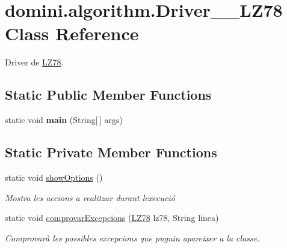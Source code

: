 \hypertarget{classdomini_1_1algorithm_1_1Driver____LZ78}{}\section{domini.\+algorithm.\+Driver\+\_\+\+\_\+\+L\+Z78 Class Reference}
\label{classdomini_1_1algorithm_1_1Driver____LZ78}


Driver de \hyperlink{classdomini_1_1algorithm_1_1LZ78}{L\+Z78}.  


\subsection*{Static Public Member Functions}
\begin{DoxyCompactItemize}
\item 
\mbox{\label{classdomini_1_1algorithm_1_1Driver____LZ78_a3f8db12503ffe92702d5b6670c56e792}} 
static void {\bfseries main} (String\mbox{[}$\,$\mbox{]} args)
\end{DoxyCompactItemize}
\subsection*{Static Private Member Functions}
\begin{DoxyCompactItemize}
\item 
\mbox{\label{classdomini_1_1algorithm_1_1Driver____LZ78_af5e77bd40dbe6c3fa84ee5ee996b6dfe}} 
static void \hyperlink{classdomini_1_1algorithm_1_1Driver____LZ78_af5e77bd40dbe6c3fa84ee5ee996b6dfe}{show\+Options} ()
\begin{DoxyCompactList}\small\item\em Mostra les accions a realitzar durant l\textquotesingle{}execució \end{DoxyCompactList}\item 
static void \hyperlink{classdomini_1_1algorithm_1_1Driver____LZ78_a21b185a3310ced322a1eb1b49f889f15}{comprovar\+Excepcions} (\hyperlink{classdomini_1_1algorithm_1_1LZ78}{L\+Z78} lz78, String linea)
\begin{DoxyCompactList}\small\item\em Comprovarà les possibles excepcions que puguin apareixer a la classe. \end{DoxyCompactList}\end{DoxyCompactItemize}


